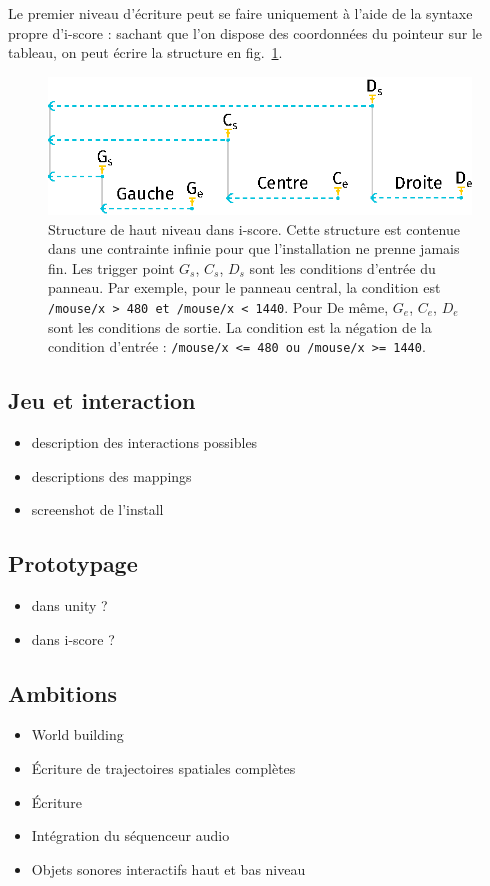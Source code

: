 \documentclass[french]{article}
\begin{document}
    
    Le premier niveau d'écriture peut se faire uniquement à l'aide de la syntaxe propre d'i-score : 
    sachant que l'on dispose des coordonnées du pointeur sur le tableau, on peut écrire la structure en 
    fig.~\ref{fig.1stlevel}.
    
    \begin{figure}[h]
        \centering
        \includegraphics{images/1stcase.eps}
        \caption{Structure de haut niveau dans i-score. Cette structure est contenue dans une contrainte infinie pour que l'installation ne prenne jamais fin. Les trigger point $G_s$, $C_s$, $D_s$ sont les conditions d'entrée du panneau. Par exemple, pour le panneau central, la condition est \lstinline{/mouse/x > 480 et /mouse/x < 1440}. Pour De même, $G_e$, $C_e$, $D_e$ sont les conditions de sortie. La condition est la négation de la condition d'entrée : \lstinline{/mouse/x <= 480 ou /mouse/x >= 1440}.}
        \label{fig.1stlevel}
    \end{figure}
    \subsection*{Jeu et interaction}
    \begin{itemize}
    \item description des interactions possibles
    \item descriptions des mappings
    \item screenshot de l'install
    \end{itemize}
    
    \subsection*{Prototypage}
    \begin{itemize}
    \item dans unity ? 
    
    \item dans i-score ? 
    \end{itemize}
    
    \subsection*{Ambitions}
    \begin{itemize}
    \item World building
    \item Écriture de trajectoires spatiales complètes
    \item Écriture 
    \item Intégration du séquenceur audio
    \item Objets sonores interactifs haut et bas niveau
    \end{itemize}
\end{document}
